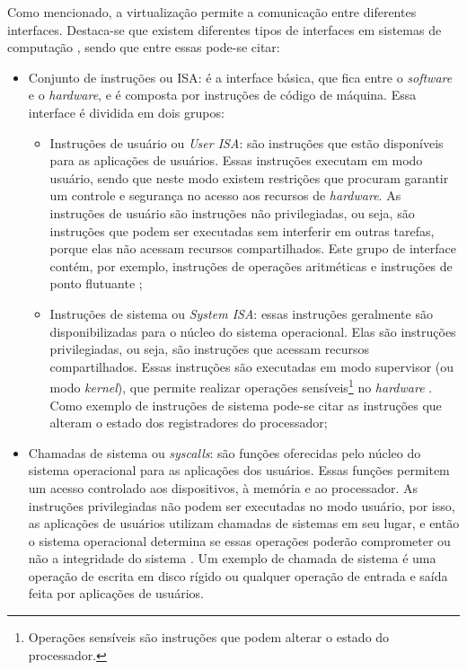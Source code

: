 Como mencionado, a virtualização permite a comunicação entre diferentes interfaces. Destaca-se que existem diferentes tipos de interfaces
em sistemas de computação \cite{maziero2013}, sendo que entre essas pode-se citar:
\begin{itemize}
 \item Conjunto de instruções ou \ac{ISA}: é a interface básica, que fica entre o \textit{software} e o \textit{hardware}, e é composta por 
 instruções de código de máquina. Essa interface é dividida em dois grupos:
 \begin{itemize}
  \item Instruções de usuário ou \textit{User \ac{ISA}}: são instruções que estão disponíveis para as aplicações de usuários. Essas instruções 
  executam em modo usuário, sendo que neste modo existem restrições que procuram garantir um controle e segurança no acesso aos recursos de 
  \textit{hardware}. As instruções de usuário são instruções não privilegiadas, ou seja, são instruções que podem ser executadas sem interferir 
  em outras tarefas, porque elas não acessam recursos compartilhados. Este grupo de interface contém, por exemplo, instruções de operações 
  aritméticas e instruções de ponto flutuante \cite{buyya2013};
  \item Instruções de sistema ou \textit{System \ac{ISA}}: essas instruções geralmente são disponibilizadas para o núcleo do sistema operacional. 
  Elas são instruções privilegiadas, ou seja, são instruções que acessam recursos compartilhados. Essas instruções são executadas em modo 
  supervisor (ou modo \textit{kernel}), que permite realizar operações sensíveis\footnote[1]{Operações sensíveis são instruções que podem alterar o 
  estado do processador.} no \textit{hardware} \cite{buyya2013}. Como exemplo de instruções de sistema pode-se citar as instruções que alteram 
  o estado dos registradores do processador; %
 \end{itemize}
 \item Chamadas de sistema ou \textit{syscalls}: são funções oferecidas pelo núcleo do sistema operacional para as aplicações dos usuários.
 Essas funções permitem um acesso controlado aos dispositivos, à memória e ao processador. 
 As instruções privilegiadas não podem ser executadas no modo usuário, por isso, as aplicações de usuários utilizam chamadas de sistemas em seu 
 lugar, e então o sistema operacional determina se essas operações poderão comprometer ou não a integridade do sistema \cite{marinescu2013}.
 Um exemplo de chamada de sistema é uma operação de escrita em disco rígido ou qualquer operação de entrada e saída feita por aplicações de usuários.
\end{itemize}


